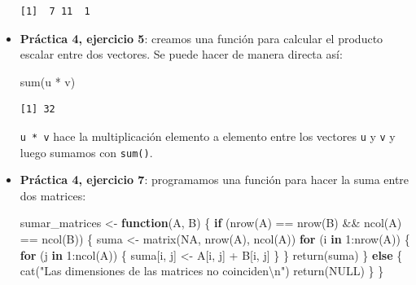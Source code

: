 \documentclass[
]{book}
\newenvironment{Shaded}{\begin{snugshade}}{\end{snugshade}}
\newcommand{\ConstantTok}[1]{\textcolor[rgb]{0.00,0.00,0.00}{#1}}
\newcommand{\ControlFlowTok}[1]{\textcolor[rgb]{0.13,0.29,0.53}{\textbf{#1}}}
\newcommand{\DecValTok}[1]{\textcolor[rgb]{0.00,0.00,0.81}{#1}}
\newcommand{\FunctionTok}[1]{\textcolor[rgb]{0.00,0.00,0.00}{#1}}
\newcommand{\NormalTok}[1]{#1}
\newcommand{\OtherTok}[1]{\textcolor[rgb]{0.56,0.35,0.01}{#1}}
\newcommand{\SpecialCharTok}[1]{\textcolor[rgb]{0.00,0.00,0.00}{#1}}
\newcommand{\StringTok}[1]{\textcolor[rgb]{0.31,0.60,0.02}{#1}}
\begin{document}
\begin{itemize}
\begin{verbatim}
[1]  7 11  1
\end{verbatim}
\item
  \textbf{Práctica 4, ejercicio 5}: creamos una función para calcular el producto escalar entre dos vectores. Se puede hacer de manera directa así:

\begin{Shaded}
\begin{Highlighting}[]
\FunctionTok{sum}\NormalTok{(u }\SpecialCharTok{*}\NormalTok{ v)}
\end{Highlighting}
\end{Shaded}

\begin{verbatim}
[1] 32
\end{verbatim}

  \texttt{u\ *\ v} hace la multiplicación elemento a elemento entre los vectores \texttt{u} y \texttt{v} y luego sumamos con \texttt{sum()}.
\item
  \textbf{Práctica 4, ejercicio 7}: programamos una función para hacer la suma entre dos matrices:

\begin{Shaded}
\begin{Highlighting}[]
\NormalTok{sumar\_matrices }\OtherTok{\textless{}{-}} \ControlFlowTok{function}\NormalTok{(A, B) \{}
    \ControlFlowTok{if}\NormalTok{ (}\FunctionTok{nrow}\NormalTok{(A) }\SpecialCharTok{==} \FunctionTok{nrow}\NormalTok{(B) }\SpecialCharTok{\&\&} \FunctionTok{ncol}\NormalTok{(A) }\SpecialCharTok{==} \FunctionTok{ncol}\NormalTok{(B)) \{}
\NormalTok{        suma }\OtherTok{\textless{}{-}} \FunctionTok{matrix}\NormalTok{(}\ConstantTok{NA}\NormalTok{, }\FunctionTok{nrow}\NormalTok{(A), }\FunctionTok{ncol}\NormalTok{(A))}
        \ControlFlowTok{for}\NormalTok{ (i }\ControlFlowTok{in} \DecValTok{1}\SpecialCharTok{:}\FunctionTok{nrow}\NormalTok{(A)) \{}
            \ControlFlowTok{for}\NormalTok{ (j }\ControlFlowTok{in} \DecValTok{1}\SpecialCharTok{:}\FunctionTok{ncol}\NormalTok{(A)) \{}
\NormalTok{                suma[i, j] }\OtherTok{\textless{}{-}}\NormalTok{ A[i, j] }\SpecialCharTok{+}\NormalTok{ B[i, j]}
\NormalTok{            \}}
\NormalTok{        \}}
        \FunctionTok{return}\NormalTok{(suma)}
\NormalTok{    \} }\ControlFlowTok{else}\NormalTok{ \{}
        \FunctionTok{cat}\NormalTok{(}\StringTok{"Las dimensiones de las matrices no coinciden}\SpecialCharTok{\textbackslash{}n}\StringTok{"}\NormalTok{)}
        \FunctionTok{return}\NormalTok{(}\ConstantTok{NULL}\NormalTok{)}
\NormalTok{    \}}
\NormalTok{\}}


\end{Highlighting}
\end{Shaded}
\end{itemize}
\end{document}
